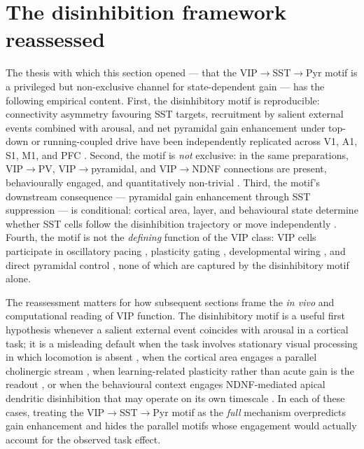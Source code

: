 \documentclass[11pt]{article}
\let\origrightarrow\rightarrow
\def\rightarrow{\ensuremath{\origrightarrow}}
\begin{document}
\section{The disinhibition framework reassessed}

The thesis with which this section opened --- that the VIP\rightarrow SST\rightarrow Pyr motif is a privileged but non-exclusive channel for state-dependent gain --- has the following empirical content. First, the disinhibitory motif is reproducible: connectivity asymmetry favouring SST targets, recruitment by salient external events combined with arousal, and net pyramidal gain enhancement under top-down or running-coupled drive have been independently replicated across V1, A1, S1, M1, and PFC \citep{Pfeffer2013, Pi2013, Lee2013, Fu2014, Pinto2015, Kuchibhotla2017, Williams2019, Kamigaki2017, Anastasiades2021a, Veit2023}. Second, the motif is \textit{not} exclusive: in the same preparations, VIP\rightarrow PV, VIP\rightarrow pyramidal, and VIP\rightarrow NDNF connections are present, behaviourally engaged, and quantitatively non-trivial \citep{Karnani2016a, Karnani2016b, Yu2019, Abs2018, Schneidermizell2025}. Third, the motif's downstream consequence --- pyramidal gain enhancement through SST suppression --- is conditional: cortical area, layer, and behavioural state determine whether SST cells follow the disinhibition trajectory or move independently \citep{Pakan2016, Dipoppa2018, Garrett2020, Veit2023}. Fourth, the motif is not the \textit{defining} function of the VIP class: VIP cells participate in oscillatory pacing \citep{Turi2019, Bastos2023a}, plasticity gating \citep{Cichon2017, Krabbe2019, Tamboli2024, Ramosprats2022}, developmental wiring \citep{Batistabrito2017, Priya2018, Ferguson2023b}, and direct pyramidal control \citep{Karnani2016b, Lee2013, Schneidermizell2025}, none of which are captured by the disinhibitory motif alone.

The reassessment matters for how subsequent sections frame the \textit{in vivo} and computational reading of VIP function. The disinhibitory motif is a useful first hypothesis whenever a salient external event coincides with arousal in a cortical task; it is a misleading default when the task involves stationary visual processing in which locomotion is absent \citep{Pakan2016, Dipoppa2018, Garrett2020}, when the cortical area engages a parallel cholinergic stream \citep{Kuchibhotla2017}, when learning-related plasticity rather than acute gain is the readout \citep{Cichon2017, Krabbe2019, Abs2018, Tamboli2024}, or when the behavioural context engages NDNF-mediated apical dendritic disinhibition that may operate on its own timescale \citep{Abs2018, Anastasiades2021a}. In each of these cases, treating the VIP\rightarrow SST\rightarrow Pyr motif as the \textit{full} mechanism overpredicts gain enhancement and hides the parallel motifs whose engagement would actually account for the observed task effect.
\end{document}
